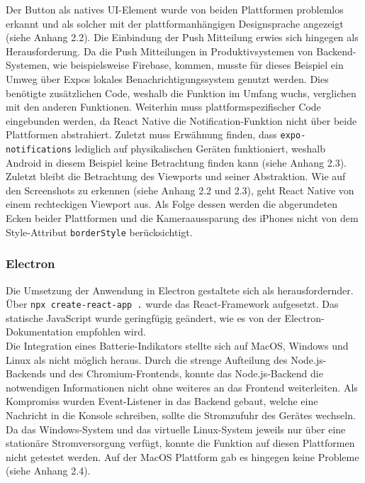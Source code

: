 \documentclass[a4paper]{scrartcl}
\begin{document}
Der Button als natives UI-Element wurde von beiden Plattformen problemlos erkannt und als solcher mit der plattformanhängigen Designsprache angezeigt (siehe Anhang 2.2). Die Einbindung der Push Mitteilung erwies sich hingegen als Herausforderung. Da die Push Mitteilungen in Produktivsystemen von Backend-Systemen, wie beispielsweise Firebase, kommen, musste für dieses Beispiel ein Umweg über Expos lokales Benachrichtigungssystem genutzt werden. Dies benötigte zusätzlichen Code, weshalb die Funktion im Umfang wuchs, verglichen mit den anderen Funktionen. Weiterhin muss plattformspezifischer Code eingebunden werden, da React Native die Notification-Funktion nicht über beide Plattformen abstrahiert. Zuletzt muss Erwähnung finden, dass \texttt{expo-notifications} lediglich auf physikalischen Geräten funktioniert, weshalb Android in diesem Beispiel keine Betrachtung finden kann (siehe Anhang 2.3). \\

Zuletzt bleibt die Betrachtung des Viewports und seiner Abstraktion. Wie auf den Screenshots zu erkennen (siehe Anhang 2.2 und 2.3), geht React Native von einem rechteckigen Viewport aus. Als Folge dessen werden die abgerundeten Ecken beider Plattformen und die Kameraaussparung des iPhones nicht von dem Style-Attribut \texttt{borderStyle} berücksichtigt.

\subsubsection{Electron}

Die Umsetzung der Anwendung in Electron gestaltete sich als herausfordernder. Über \texttt{npx create-react-app .} wurde das React-Framework aufgesetzt. Das statische JavaScript wurde geringfügig geändert, wie es von der Electron-Dokumentation empfohlen wird. \\

Die Integration eines Batterie-Indikators stellte sich auf MacOS, Windows und Linux als nicht möglich heraus. Durch die strenge Aufteilung des Node.js-Backends und des Chromium-Frontends, konnte das Node.js-Backend die notwendigen Informationen nicht ohne weiteres an das Frontend weiterleiten. Als Kompromiss wurden Event-Listener in das Backend gebaut, welche eine Nachricht in die Konsole schreiben, sollte die Stromzufuhr des Gerätes wechseln. Da das Windows-System und das virtuelle Linux-System jeweils nur über eine stationäre Stromversorgung verfügt, konnte die Funktion auf diesen Plattformen nicht getestet werden. Auf der MacOS Plattform gab es hingegen keine Probleme (siehe Anhang 2.4). \\
\end{document}
